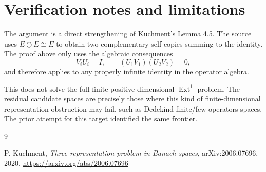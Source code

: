 \documentclass[11pt]{article}
\newcommand{\Ext}{\operatorname{Ext}^1}
\begin{document}
\section*{Verification notes and limitations}

The argument is a direct strengthening of Kuchment's Lemma 4.5. The source
uses \(E\oplus E\cong E\) to obtain two complementary self-copies summing to
the identity. The proof above only uses the algebraic consequences
\[
 V_iU_i=I,\qquad (U_1V_1)(U_2V_2)=0,
\]
and therefore applies to any properly infinite identity in the operator
algebra.

This does not solve the full finite positive-dimensional \(\Ext\) problem.
The residual candidate spaces are precisely those where this kind of
finite-dimensional representation obstruction may fail, such as
Dedekind-finite/few-operators spaces. The prior attempt for this target
identified the same frontier.

\begin{thebibliography}{9}

P. Kuchment,
\emph{Three-representation problem in Banach spaces},
arXiv:2006.07696, 2020.
\url{https://arxiv.org/abs/2006.07696}

\end{thebibliography}
\end{document}
